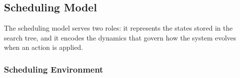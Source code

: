 \documentclass[conference]{IEEEtran}
\begin{document}
 




\subsection{Scheduling Model}
\label{sec:sched_model}
The scheduling model serves two roles: it represents the states stored in the search tree, and it encodes the dynamics that govern how the system evolves when an action is applied. 

\subsubsection{Scheduling Environment} 
\label{des}

\end{document}
